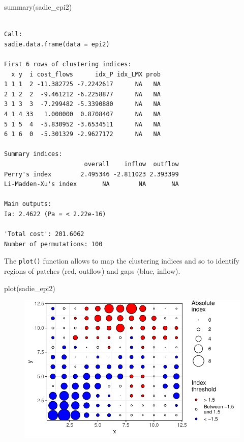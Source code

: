 \documentclass[
  letterpaper,
  DIV=11,
  numbers=noendperiod]{scrreprt}
\newenvironment{Shaded}{\begin{snugshade}}{\end{snugshade}}
\newcommand{\FunctionTok}[1]{\textcolor[rgb]{0.28,0.35,0.67}{#1}}
\newcommand{\NormalTok}[1]{\textcolor[rgb]{0.00,0.23,0.31}{#1}}
\begin{document}
\begin{Shaded}
\begin{Highlighting}[]
\FunctionTok{summary}\NormalTok{(sadie\_epi2)}
\end{Highlighting}
\end{Shaded}

\begin{verbatim}

Call:
sadie.data.frame(data = epi2)

First 6 rows of clustering indices:
  x y  i cost_flows      idx_P idx_LMX prob
1 1 1  2 -11.382725 -7.2242617      NA   NA
2 1 2  2  -9.461212 -6.2258877      NA   NA
3 1 3  3  -7.299482 -5.3390880      NA   NA
4 1 4 33   1.000000  0.8708407      NA   NA
5 1 5  4  -5.830952 -3.6534511      NA   NA
6 1 6  0  -5.301329 -2.9627172      NA   NA

Summary indices:
                      overall    inflow  outflow
Perry's index        2.495346 -2.811023 2.393399
Li-Madden-Xu's index       NA        NA       NA

Main outputs:
Ia: 2.4622 (Pa = < 2.22e-16)

'Total cost': 201.6062
Number of permutations: 100
\end{verbatim}

The \texttt{plot()} function allows to map the clustering indices and so
to identify regions of patches (red, outflow) and gaps (blue, inflow).

\begin{Shaded}
\begin{Highlighting}[]
\FunctionTok{plot}\NormalTok{(sadie\_epi2)}
\end{Highlighting}
\end{Shaded}

\begin{figure}[H]

{\centering \includegraphics{./spatial-tests_files/figure-pdf/unnamed-chunk-82-1.pdf}

}

\end{figure}
\end{document}
